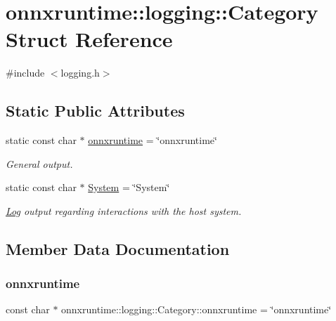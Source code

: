 \hypertarget{structonnxruntime_1_1logging_1_1Category}{}\section{onnxruntime\+:\+:logging\+:\+:Category Struct Reference}
\label{structonnxruntime_1_1logging_1_1Category}


{\ttfamily \#include $<$logging.\+h$>$}

\subsection*{Static Public Attributes}
\begin{DoxyCompactItemize}
\item 
static const char $\ast$ \mbox{\hyperlink{structonnxruntime_1_1logging_1_1Category_acf8465d214f4b51ab0b99f6195f81369}{onnxruntime}} = \char`\"{}onnxruntime\char`\"{}
\begin{DoxyCompactList}\small\item\em General output. \end{DoxyCompactList}\item 
static const char $\ast$ \mbox{\hyperlink{structonnxruntime_1_1logging_1_1Category_a923c405d07be36f1bbd6c06548ba0267}{System}} = \char`\"{}System\char`\"{}
\begin{DoxyCompactList}\small\item\em \mbox{\hyperlink{classonnxruntime_1_1Log}{Log}} output regarding interactions with the host system. \end{DoxyCompactList}\end{DoxyCompactItemize}


\subsection{Member Data Documentation}
\mbox{\label{structonnxruntime_1_1logging_1_1Category_acf8465d214f4b51ab0b99f6195f81369}} 
\subsubsection{\texorpdfstring{onnxruntime}{onnxruntime}}
{\footnotesize\ttfamily const char $\ast$ onnxruntime\+::logging\+::\+Category\+::onnxruntime = \char`\"{}onnxruntime\char`\"{}\hspace{0.3cm}{\ttfamily [static]}}



